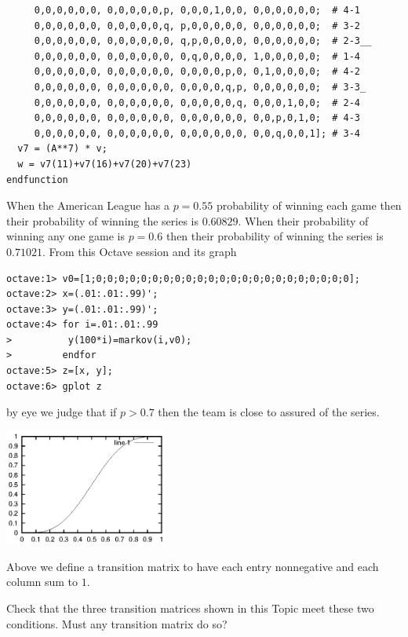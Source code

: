 \begin{exercises}
\begin{answer}
\begin{exparts}
\begin{lstlisting}
     0,0,0,0,0,0, 0,0,0,0,0,p, 0,0,0,1,0,0, 0,0,0,0,0,0;  # 4-1
     0,0,0,0,0,0, 0,0,0,0,0,q, p,0,0,0,0,0, 0,0,0,0,0,0;  # 3-2
     0,0,0,0,0,0, 0,0,0,0,0,0, q,p,0,0,0,0, 0,0,0,0,0,0;  # 2-3__
     0,0,0,0,0,0, 0,0,0,0,0,0, 0,q,0,0,0,0, 1,0,0,0,0,0;  # 1-4
     0,0,0,0,0,0, 0,0,0,0,0,0, 0,0,0,0,p,0, 0,1,0,0,0,0;  # 4-2
     0,0,0,0,0,0, 0,0,0,0,0,0, 0,0,0,0,q,p, 0,0,0,0,0,0;  # 3-3_
     0,0,0,0,0,0, 0,0,0,0,0,0, 0,0,0,0,0,q, 0,0,0,1,0,0;  # 2-4
     0,0,0,0,0,0, 0,0,0,0,0,0, 0,0,0,0,0,0, 0,0,p,0,1,0;  # 4-3
     0,0,0,0,0,0, 0,0,0,0,0,0, 0,0,0,0,0,0, 0,0,q,0,0,1]; # 3-4
  v7 = (A**7) * v;
  w = v7(11)+v7(16)+v7(20)+v7(23)
endfunction
\end{lstlisting}
       When the American League has a
       $p=0.55$ probability of winning each game then their probability
       of winning the series is $0.60829$.
       When their probability of winning any one game is $p=0.6$
       then their probability of winning the series is  
       $0.71021$.
      \partsitem From this Octave session and its graph
\begin{lstlisting}
octave:1> v0=[1;0;0;0;0;0;0;0;0;0;0;0;0;0;0;0;0;0;0;0;0;0;0;0];
octave:2> x=(.01:.01:.99)';
octave:3> y=(.01:.01:.99)';
octave:4> for i=.01:.01:.99
>          y(100*i)=markov(i,v0);
>         endfor
octave:5> z=[x, y];
octave:6> gplot z
\end{lstlisting}
       by eye we judge that if $p>0.7$ then the team is close to assured
       of the series.
       \begin{center}
         \includegraphics[width=0.4\textwidth]{map/pix/ws.eps}
       \end{center}
     \end{exparts}
    \end{answer}
  \item 
    Above we define a transition matrix to have 
    each entry nonnegative and each column sum to $1$.
    \begin{exparts}
      \item Check that the three transition matrices shown in this Topic
        meet these two conditions.
        Must any transition matrix do so?

\end{exparts}
\end{exercises}
